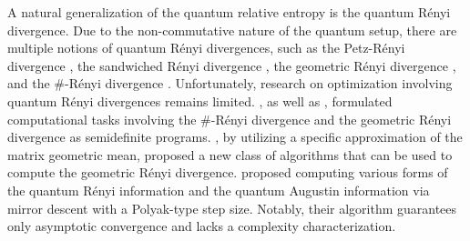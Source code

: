 \documentclass{article}
\begin{document}
A natural generalization of the quantum relative entropy is the quantum R\'{e}nyi divergence. 
Due to the non-commutative nature of the quantum setup, there are %
multiple notions of quantum R\'{e}nyi divergences, 
such as the Petz-R{\'e}nyi divergence \cite{Petz1986}, the sandwiched R{\'e}nyi divergence \cite{Muller2013,Wilde2014}, the geometric R\'{e}nyi divergence \cite{Fang2021,Matsumoto2018}, and the \#-R{\'e}nyi divergence \cite{Fawzi2021}.
Unfortunately, research on optimization involving quantum R{\'e}nyi divergences remains limited. 
\citet{Fawzi2021}, 
as well as 
\citet{Fang2021}, 
formulated computational tasks involving the \#-R{\'e}nyi divergence and the geometric R{\'e}nyi divergence as semidefinite programs.
\citet{Liu2024}, by utilizing a specific approximation of the matrix geometric mean,  proposed a new class of algorithms that can be used to compute the geometric R\'{e}nyi divergence. 
\citet{You2022} proposed computing various forms of the quantum R\'{e}nyi information and the quantum Augustin information via mirror descent with a Polyak-type step size. 
Notably, their algorithm guarantees only asymptotic convergence and lacks a complexity characterization. 
\end{document}
